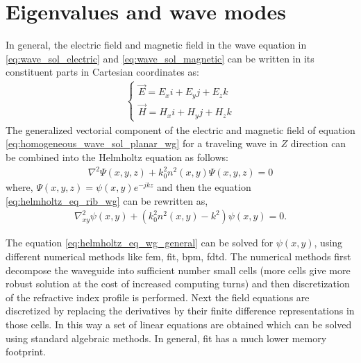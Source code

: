 \documentclass[../report.tex]{subfiles}
\begin{document}
		\section{Eigenvalues and wave modes}
In general, the electric field and magnetic field in the wave equation in \ref{eq:wave_sol_electric} and \ref{eq:wave_sol_magnetic} can be written in its constituent parts in Cartesian coordinates as:
\begin{equation}\label{eq:em_field_cart_cord}
\begin{aligned}
\begin{cases}
\vec{E}=E_{x}i+E_{y}j+E_{z}k\\
\vec{H}=H_{x}i+H_{y}j+H_{z}k
\end{cases}
\end{aligned}
\end{equation}
The generalized vectorial component of the electric and magnetic field of equation \ref{eq:homogeneous_wave_sol_planar_wg} for a traveling wave in $Z$ direction can be combined into the Helmholtz equation as follows:
\begin{equation}\label{eq:helmholtz_eq_rib_wg}
	\begin{aligned}
		\nabla ^{2}\Psi \left( x,y,z\right) +k_{0}^{2}n^{2}\left(x,y\right) \Psi \left( x,y,z\right) = 0
	\end{aligned}
\end{equation}
where, $\Psi \left( x,y,z\right) = \psi \left( x,y\right)e^{-jkz} $ and then the equation \ref{eq:helmholtz_eq_rib_wg} can be rewritten as,
\begin{equation}\label{eq:helmholtz_eq_wg_general}
\begin{aligned}
\nabla_{xy} ^{2}\psi \left( x,y\right) +\left(k_{0}^{2}n^{2}\left(x,y\right) - k^2\right)\psi \left( x,y\right) = 0.
\end{aligned}
\end{equation}

\noindent The equation \ref{eq:helmholtz_eq_wg_general} can be solved for $\psi \left( x,y\right)$, using different numerical methods like \gls{fem}, \gls{fit}, \gls{bpm}, \gls{fdtd}. The numerical methods first decompose the waveguide into sufficient number small cells (more cells give more robust solution at the cost of increased computing turns) and then discretization of the refractive index profile is performed. Next the field equations are discretized by replacing the derivatives by their finite difference representations in those cells. In this way a set of linear equations are obtained which can be solved using standard algebraic methods. In general, \gls{fit} has a much lower memory footprint.\par
\end{document}
